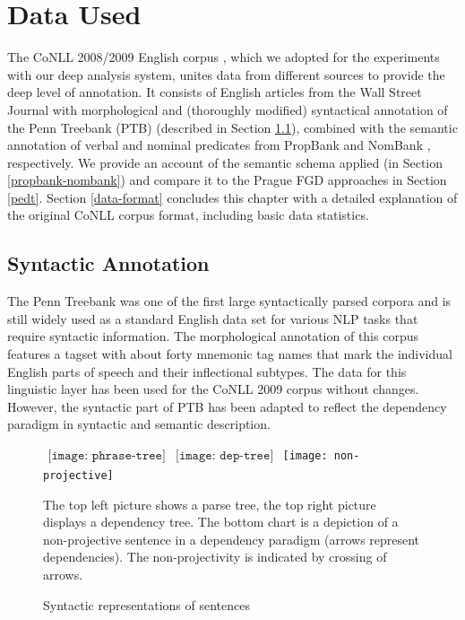 \documentclass[12pt,notitlepage,a4paper]{report}
\begin{document}
%
%
\chapter{Data Used}\label{data}
%
%

The CoNLL 2008/2009 English corpus \citep{surdeanu08,hajic09}, which we adopted for the experiments with our deep analysis system, unites data from different sources to provide the deep level of annotation. It consists of English articles from the Wall Street Journal with morphological and (thoroughly modified) syntactical annotation of the Penn Treebank (PTB) \citep{marcus93} (described in Section \ref{synt-annot}), combined with the semantic annotation of verbal and nominal predicates from PropBank \citep{palmer05} and NomBank \citep{meyers04}, respectively. We provide an account of the semantic schema applied (in Section \ref{propbank-nombank}) and compare it to the Prague FGD approaches in Section \ref{pedt}. Section \ref{data-format} concludes this chapter with a detailed explanation of the original CoNLL corpus format, including basic data statistics.

\section{Syntactic Annotation}\label{synt-annot}

The Penn Treebank was one of the first large syntactically parsed corpora and is still widely used as a standard English data set for various NLP tasks that require syntactic information. The morphological annotation of this corpus features a tagset \citep{santorini90} with about forty mnemonic tag names that mark the individual English parts of speech and their inflectional subtypes. The data for this linguistic layer has been used for the CoNLL 2009 corpus without changes. However, the syntactic part of PTB has been adapted to reflect the dependency paradigm in syntactic and semantic description.

\begin{figure}[htb]\footnotesize
\caption{Syntactic representations of sentences}\label{fig:trees}
\begin{center}
$\begin{array}{cc}
\texttt{[image: phrase-tree]} & \texttt{[image: dep-tree]}
\end{array}$
\texttt{[image: non-projective]}
\end{center}
The top left picture shows a parse tree, the top right picture displays a dependency tree. The bottom chart is a depiction of a non-projective sentence in a dependency paradigm (arrows represent dependencies). The non-projectivity is indicated by crossing of arrows.
\end{figure}
\end{document}

